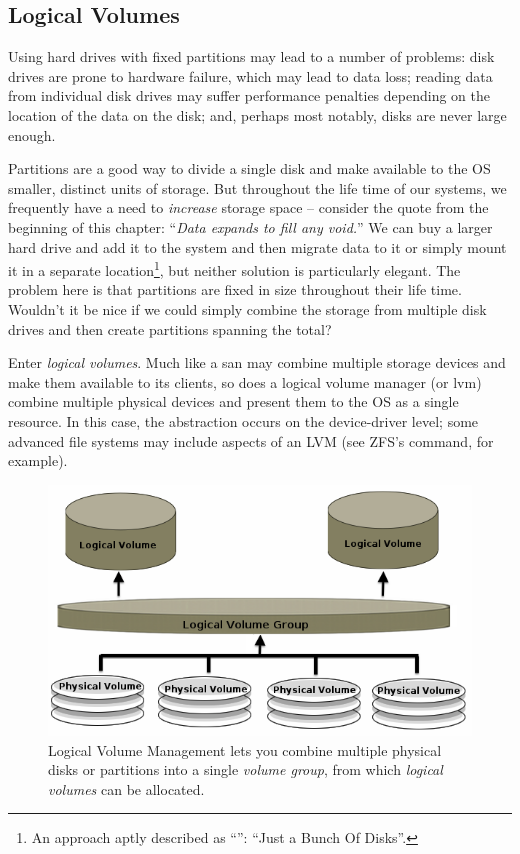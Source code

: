 \subsection{Logical Volumes}
\label{file systems:storage-models:dividing-and-combining-disks:logical-volumes}

Using hard drives with fixed partitions may lead to a
number of problems: disk drives are prone to hardware
failure, which may lead to data loss; reading data
from individual disk drives may suffer performance
penalties depending on the location of the data on the
disk; and, perhaps most notably, disks are never large
enough.

Partitions are a good way to divide a single disk and
make available to the OS smaller, distinct units of
storage.  But throughout the life time of our systems,
we frequently have a need to {\em increase} storage
space -- consider the quote from the beginning of this
chapter: ``{\em Data expands to fill any void.}''  We
can buy a larger hard drive and add it to the system
and then migrate data to it or simply mount it in a
separate location\footnote{An approach aptly
described as ``'':
``Just a Bunch Of Disks''.}, but neither solution is
particularly elegant.  The problem here is that
partitions are fixed in size throughout their life
time.  Wouldn't it be nice if we could simply combine
the storage from multiple disk drives and then create
partitions spanning the total?

Enter {\em logical volumes}.  Much like a
\gls{san} may combine multiple storage
devices and make them available to its clients, so
does a logical volume manager (or
\gls{lvm}) combine multiple physical
devices and present them to the OS as a single
resource.  In this case, the abstraction occurs on the
device-driver level; some advanced file systems may
include aspects of an LVM (see ZFS's
 command, for example).

\begin{figure}[ht]
	\centering
	\includegraphics[width=.75\textwidth]{04/pics/lvm}
		\caption[Logical Volume Management]{Logical Volume
			Management lets you combine multiple physical disks
			or partitions into a single {\em volume group},
			from which {\em logical volumes} can be allocated.
			\label{fig:file-systems:lvm}}
\end{figure}



